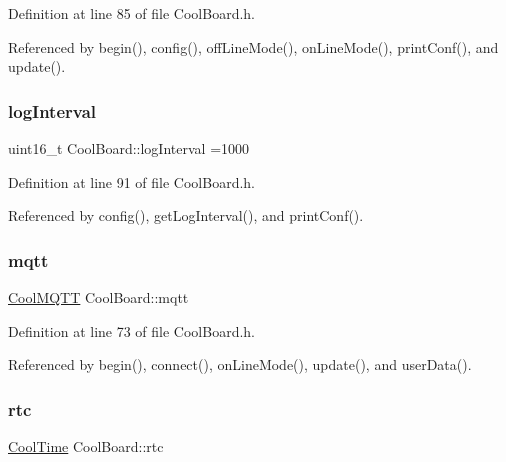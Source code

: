 Definition at line 85 of file Cool\+Board.\+h.



Referenced by begin(), config(), off\+Line\+Mode(), on\+Line\+Mode(), print\+Conf(), and update().

\mbox{\label{classCoolBoard_a4de0096d575d66b472c4c1f0111fd452}} 
\subsubsection{\texorpdfstring{log\+Interval}{logInterval}}
{\footnotesize\ttfamily uint16\+\_\+t Cool\+Board\+::log\+Interval =1000\hspace{0.3cm}{\ttfamily [private]}}



Definition at line 91 of file Cool\+Board.\+h.



Referenced by config(), get\+Log\+Interval(), and print\+Conf().

\mbox{\label{classCoolBoard_a2399f44d7c23c1149a335cb3b46d90f1}} 
\subsubsection{\texorpdfstring{mqtt}{mqtt}}
{\footnotesize\ttfamily \hyperlink{classCoolMQTT}{Cool\+M\+Q\+TT} Cool\+Board\+::mqtt\hspace{0.3cm}{\ttfamily [private]}}



Definition at line 73 of file Cool\+Board.\+h.



Referenced by begin(), connect(), on\+Line\+Mode(), update(), and user\+Data().

\mbox{\label{classCoolBoard_a50d2a6716879d64a85f3c6b44ad63275}} 
\subsubsection{\texorpdfstring{rtc}{rtc}}
{\footnotesize\ttfamily \hyperlink{classCoolTime}{Cool\+Time} Cool\+Board\+::rtc\hspace{0.3cm}{\ttfamily [private]}}




